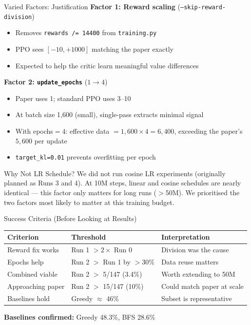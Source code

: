 \documentclass[aspectratio=169,11pt]{beamer}
\begin{document}
\begin{frame}{Varied Factors: Justification}
  \small
  \textbf{Factor 1: Reward scaling} (\texttt{--skip-reward-division})
  \begin{itemize}
    \item Removes \texttt{rewards /= 14400} from \texttt{training.py}
    \item PPO sees $[-10, +1000]$ matching the paper exactly
    \item Expected to help the critic learn meaningful value differences
  \end{itemize}

  \medskip
  \textbf{Factor 2: \texttt{update\_epochs}} ($1 \to 4$)
  \begin{itemize}
    \item Paper uses 1; standard PPO uses 3--10
    \item At batch size 1{,}600 (small), single-pass extracts minimal signal
    \item With epochs${}=4$: effective data $= 1{,}600 \times 4 = 6{,}400$,
      exceeding the paper's $5{,}600$ per update
    \item \texttt{target\_kl=0.01} prevents overfitting per epoch
  \end{itemize}

  \medskip
  \begin{block}{Why Not LR Schedule?}
    We did not run cosine LR experiments (originally planned as Runs 3 and 4).
    At 10M steps, linear and cosine schedules are nearly identical ---
    this factor only matters for long runs ($>$50M).
    We prioritised the two factors most likely to matter at this training budget.
  \end{block}
\end{frame}

\begin{frame}{Success Criteria (Before Looking at Results)}
  \begin{center}
  \begin{tabular}{lll}
    \toprule
    \textbf{Criterion} & \textbf{Threshold} & \textbf{Interpretation} \\
    \midrule
    Reward fix works        & Run 1 $> 2\times$ Run 0 & Division was the cause \\
    Epochs help             & Run 2 $>$ Run 1 by $>$30\% & Data reuse matters \\
    Combined viable         & Run 2 $>$ 5/147 (3.4\%) & Worth extending to 50M \\
    Approaching paper       & Run 2 $>$ 15/147 (10\%) & Could match paper at scale \\
    \midrule
    Baselines hold          & Greedy $\approx$ 46\% & Subset is representative \\
    \bottomrule
  \end{tabular}
  \end{center}

  \bigskip
  \textcolor{good}{\checkmark} \textbf{Baselines confirmed:} Greedy 48.3\%, BFS 28.6\%
\end{frame}
\end{document}
